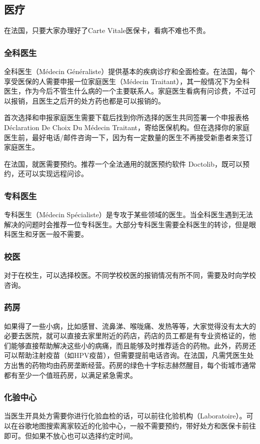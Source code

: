 \subsection{医疗}

在法国，只要大家办理好了Carte Vitale医保卡，看病不难也不贵。

\subsubsection{全科医生}	
全科医生（Médecin Généraliste）提供基本的疾病诊疗和全面检查。在法国，每个享受医保的人需要申报一位家庭医生（Médecin Traitant），其一般情况下为全科医生，作为今后不管生什么病的一个主要联系人。家庭医生看病有问诊费，不过可以报销，且医生之后开的处方药也都是可以报销的。

首次选择和申报家庭医生需要下载后找到你所选择的医生共同签署一个申报表格Déclaration De Choix Du Médecin Traitant，寄给医保机构。但在选择你的家庭医生前，最好电话/邮件咨询一下，因为有一定数量的医生不再接受新患者来签订家庭医生。

在法国，就医需要预约。推荐一个全法通用的就医预约软件 Doctolib，既可以预约，还可以实现远程问诊。

\subsubsection{专科医生}
专科医生（Médecin Spécialiste）是专攻于某些领域的医生。当全科医生遇到无法解决的问题时会推荐一位专科医生。大部分专科医生需要全科医生的转诊，但是眼科医生和牙医一般不需要。

\subsubsection{校医}
对于在校生，可以选择校医。不同学校校医的报销情况有所不同，需要及时向学校咨询。

\subsubsection{药房}
如果得了一些小病，比如感冒、流鼻涕、喉咙痛、发热等等，大家觉得没有太大的必要去医院，就可以直接去家里附近的药店，药店的员工都是有专业资格证的，他们能够直接帮助解决这些小的病痛，而且能够及时推荐适合的药物。此外，药房还可以帮助注射疫苗（如HPV疫苗），但需要提前电话咨询。在法国，凡需凭医生处方出售的药物均由药房垄断经营。药房的绿色十字标志赫然醒目，每个街城市通常都有至少一个值班药房，以满足紧急需求。

\subsubsection{化验中心}
当医生开具处方需要你进行化验血检的话，可以前往化验机构（Laboratoire）。可以在谷歌地图搜索离家较近的化验中心，一般不需要预约，带好处方和医保卡前往即可。但如果不放心也可以选择约定时间。

